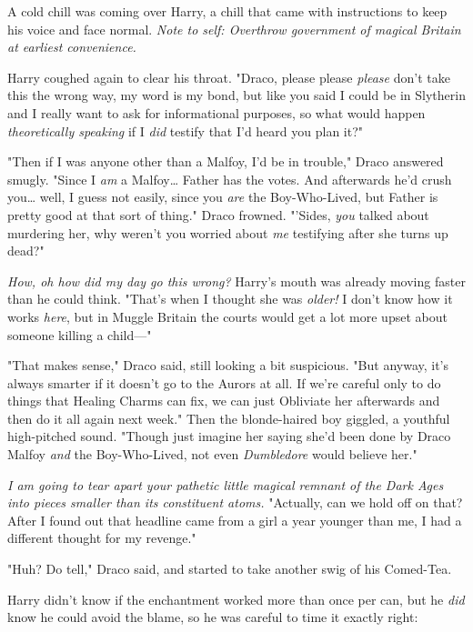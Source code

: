 A cold chill was coming over Harry, a chill that came with instructions to keep 
his voice and face normal. \emph{Note to self: Overthrow government of magical 
Britain at earliest convenience.}

Harry coughed again to clear his throat. "Draco, please please \emph{please} 
don't take this the wrong way, my word is my bond, but like you said I could be 
in Slytherin and I really want to ask for informational purposes, so what would 
happen \emph{theoretically speaking} if I \emph{did} testify that I'd heard you 
plan it?"

"Then if I was anyone other than a Malfoy, I'd be in trouble," Draco answered 
smugly. "Since I \emph{am} a Malfoy{\ldots} Father has the votes. And 
afterwards he'd crush you{\ldots} well, I guess not easily, since you 
\emph{are} the Boy-Who-Lived, but Father is pretty good at that sort of thing." 
Draco frowned. "'Sides, \emph{you} talked about murdering her, why weren't you 
worried about \emph{me} testifying after she turns up dead?"

\emph{How, oh how did my day go this wrong?} Harry's mouth was already moving 
faster than he could think. "That's when I thought she was \emph{older!} I 
don't know how it works \emph{here}, but in Muggle Britain the courts would get 
a lot more upset about someone killing a child---"

"That makes sense," Draco said, still looking a bit suspicious. "But anyway, 
it's always smarter if it doesn't go to the Aurors at all. If we're careful 
only to do things that Healing Charms can fix, we can just Obliviate her 
afterwards and then do it all again next week." Then the blonde-haired boy 
giggled, a youthful high-pitched sound. "Though just imagine her saying she'd 
been done by Draco Malfoy \emph{and} the Boy-Who-Lived, not even 
\emph{Dumbledore} would believe her."

\emph{I am going to tear apart your pathetic little magical remnant of the Dark 
Ages into pieces smaller than its constituent atoms.} "Actually, can we hold 
off on that? After I found out that headline came from a girl a year younger 
than me, I had a different thought for my revenge."

"Huh? Do tell," Draco said, and started to take another swig of his Comed-Tea.

Harry didn't know if the enchantment worked more than once per can, but he 
\emph{did} know he could avoid the blame, so he was careful to time it exactly 
right:

